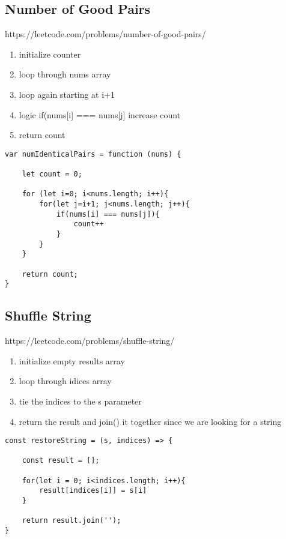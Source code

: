 \documentclass[10pt]{article}
\begin{document}
\pagebreak
\medskip %
\subsection{Number of Good Pairs}
https://leetcode.com/problems/number-of-good-pairs/

\begin{enumerate}
	\item initialize counter
	\item loop through nums array
	\item loop again starting at i+1 
	\item logic if(nums[i] === nums[j] increase count
	\item return count
\end{enumerate}

\begin{lstlisting}[title=Solution numIdenticalPairs, captionpos=t]
var numIdenticalPairs = function (nums) {

    let count = 0;

    for (let i=0; i<nums.length; i++){
        for(let j=i+1; j<nums.length; j++){
            if(nums[i] === nums[j]){
                count++
            }
        }
    }
    
    return count; 
}
\end{lstlisting}

\medskip %

\pagebreak
\medskip %
\subsection{Shuffle String}
https://leetcode.com/problems/shuffle-string/

\begin{enumerate}
	\item initialize empty results array
	\item loop through idices array
	\item tie the indices to the s parameter
	\item return the result and join() it together since we are looking for a string 
\end{enumerate}

\begin{lstlisting}[title=Solution restoreString, captionpos=t]
const restoreString = (s, indices) => {
    
    const result = [];

    for(let i = 0; i<indices.length; i++){
        result[indices[i]] = s[i]
    }

    return result.join('');
}
\end{lstlisting}
\end{document}
